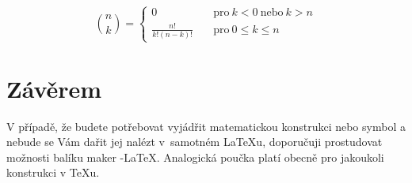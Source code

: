 \documentclass[11pt,a4paper,titlepage,twocolumn]{article}
\theoremstyle{definition}
\begin{document}
	$$	{n \choose k}
		=\left\{ 
		\displaystyle\begin{array}{ll}
			0 &  \quad \mbox{pro}\ k < 0\ \mbox{nebo}\ k > n\\
			\frac{n!}{k!(n-k)!} & \quad \mbox{pro}\ 0 \leq k \leq n
		\end{array}
	\right.$$

\section{Závěrem}
	V případě, že budete potřebovat vyjádřit matema\-tickou konstrukci nebo symbol a nebude se 
	Vám dařit jej nalézt v~samotném \LaTeX u, doporučuji prostudovat možnosti balíku maker \AmS -\LaTeX.
	Analogická poučka platí obecně pro jakoukoli konstrukci v \TeX u.
\end{document}
